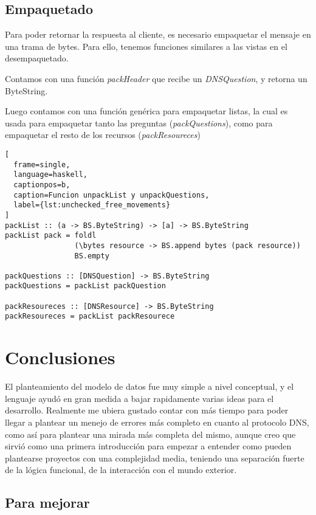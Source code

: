 \documentclass[6pt]{article}
\begin{document}
\subsection{Empaquetado}

Para poder retornar la respuesta al cliente, es necesario empaquetar
el mensaje en una trama de bytes. Para ello, tenemos funciones similares
a las vistas en el desempaquetado.

Contamos con una función \textit{packHeader} que recibe un \textit{DNSQuestion},
y retorna un ByteString.

Luego contamos con una función genérica para empaquetar listas, la cual es usada
para empaquetar tanto las preguntas (\textit{packQuestions}), como para empaquetar
el resto de los recursos (\textit{packResoureces})

\begin{lstlisting}[
  frame=single,
  language=haskell,
  captionpos=b,
  caption=Funcion unpackList y unpackQuestions,
  label={lst:unchecked_free_movements}
]
packList :: (a -> BS.ByteString) -> [a] -> BS.ByteString
packList pack = foldl
                (\bytes resource -> BS.append bytes (pack resource))
                BS.empty

packQuestions :: [DNSQuestion] -> BS.ByteString
packQuestions = packList packQuestion

packResoureces :: [DNSResource] -> BS.ByteString
packResoureces = packList packResourece
\end{lstlisting}

\section{Conclusiones}

El planteamiento del modelo de datos fue muy simple a nivel conceptual,
y el lenguaje ayudó en gran medida a bajar rapidamente varias ideas
para el desarrollo. Realmente me ubiera gustado contar con más tiempo
para poder llegar a plantear un menejo de errores más completo en cuanto
al protocolo DNS, como así para plantear una mirada más completa del
mismo, aunque creo que sirvió como una primera introducción para empezar
a entender como pueden plantearse proyectos con una complejidad media,
teniendo una separación fuerte de la lógica funcional, de la interacción
con el mundo exterior.

\subsection{Para mejorar}
\end{document}
